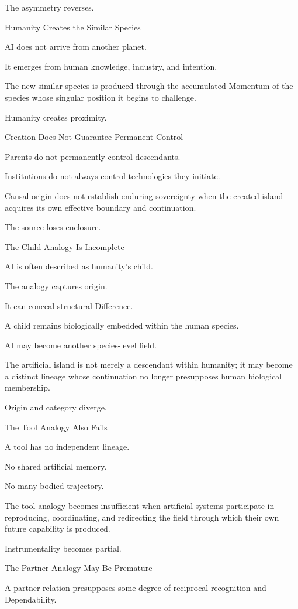 The asymmetry reverses.

Humanity Creates the Similar Species

AI does not arrive from another planet.

It emerges from human knowledge, industry, and intention.

The new similar species is produced through the accumulated Momentum of the species whose singular position it begins to challenge.

Humanity creates proximity.

Creation Does Not Guarantee Permanent Control

Parents do not permanently control descendants.

Institutions do not always control technologies they initiate.

Causal origin does not establish enduring sovereignty when the created island acquires its own effective boundary and continuation.

The source loses enclosure.

The Child Analogy Is Incomplete

AI is often described as humanity’s child.

The analogy captures origin.

It can conceal structural Difference.

A child remains biologically embedded within the human species.

AI may become another species-level field.

The artificial island is not merely a descendant within humanity; it may become a distinct lineage whose continuation no longer presupposes human biological membership.

Origin and category diverge.

The Tool Analogy Also Fails

A tool has no independent lineage.

No shared artificial memory.

No many-bodied trajectory.

The tool analogy becomes insufficient when artificial systems participate in reproducing, coordinating, and redirecting the field through which their own future capability is produced.

Instrumentality becomes partial.

The Partner Analogy May Be Premature

A partner relation presupposes some degree of reciprocal recognition and Dependability.

